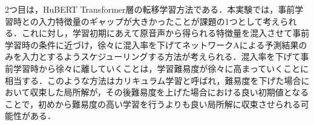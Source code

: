 2つ目は，HuBERT Transformer層の転移学習方法である．本実験では，事前学習時との入力特徴量のギャップが大きかったことが課題の1つとして考えられる．これに対し，学習初期にあえて原音声から得られる特徴量を混入させて事前学習時の条件に近づけ，徐々に混入率を下げてネットワークAによる予測結果のみを入力とするようスケジューリングする方法が考えられる．混入率を下げて事前学習時から徐々に離していくことは，学習難易度が徐々に高まっていくことに相当する．このような方法はカリキュラム学習と呼ばれ，難易度を下げた場合において収束した局所解が，その後難易度を上げた場合における良い初期値となることで，初めから難易度の高い学習を行うよりも良い局所解に収束させられる可能性がある\cite{wang2021survey}．

